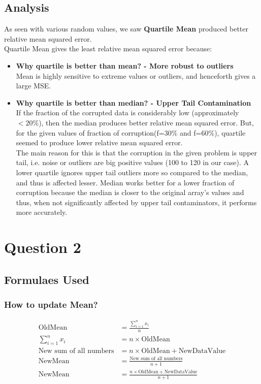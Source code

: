 \documentclass[12pt]{article}
\begin{document}
\subsection{Analysis}
As seen with various random values, we saw \textbf{Quartile Mean} produced better relative mean squared error.
    \\
Quartile Mean gives the least relative mean squared error because:
\begin{itemize}
    \item \textbf{Why quartile is better than mean? - More robust to outliers} \\
    Mean is highly sensitive to extreme values or outliers, and henceforth gives a large MSE.

    \item \textbf{Why quartile is better than median? - Upper Tail Contamination}\\
    If the fraction of the corrupted data is considerably low (approximately $<20 \% $), then the median produces better relative mean squared error. But, for the given values of fraction of corruption(f=$30\%$ and f=$60\%$), quartile seemed to produce lower relative mean squared error. 
      \\  The main reason for this is that the corruption in the given problem is upper tail, i.e. noise or outliers are big positive values (100 to 120 in our case). A lower quartile ignores upper tail outliers more so compared to the median, and thus is affected lesser. Median works better for a lower fraction of corruption because the median is closer to the original array's values and thus, when not significantly affected by upper tail contaminators, it performs more accurately.


\end{itemize}
\section{Question 2}

\subsection{Formulaes Used}
\subsubsection{How to update Mean?}

\begin{align*}
\text{OldMean} & = \frac{\sum_{i=1}^{n} x_i}{n} \\
\sum_{i=1}^{n} x_i & = n \times \text{OldMean} \\
\text{New sum of all numbers} & = n \times \text{OldMean} + \text{NewDataValue} \\
\text{NewMean} & = \frac{\text{New sum of all numbers}}{n+1} \\
\text{NewMean} & = \frac{n \times \text{OldMean} + \text{NewDataValue}}{n+1}
\end{align*}
\end{document}
